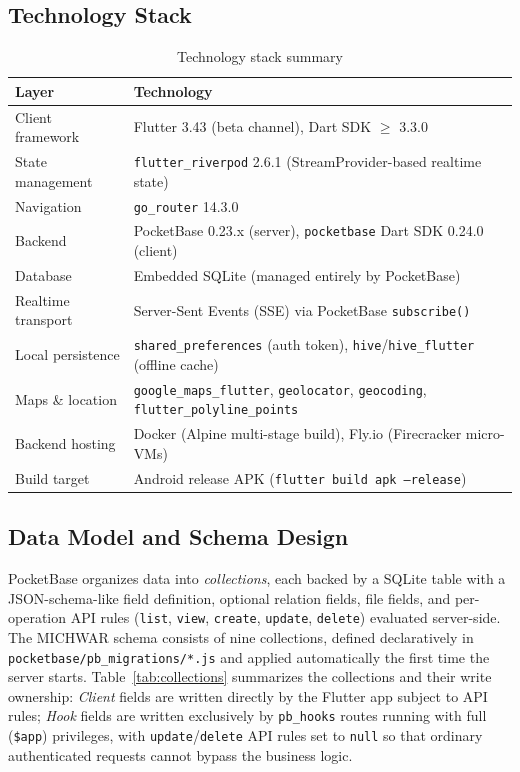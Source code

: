 \documentclass[11pt,a4paper]{article}
\begin{document}
\subsection{Technology Stack}

\begin{table}[htbp]
\centering
\caption{Technology stack summary}
\label{tab:stack}
\begin{tabular}{@{}p{3.6cm}p{9.5cm}@{}}
\toprule
\textbf{Layer} & \textbf{Technology} \\
\midrule
Client framework & Flutter 3.43 (beta channel), Dart SDK $\geq$ 3.3.0 \\
State management & \texttt{flutter\_riverpod} 2.6.1 (StreamProvider-based realtime state) \\
Navigation & \texttt{go\_router} 14.3.0 \\
Backend & PocketBase 0.23.x (server), \texttt{pocketbase} Dart SDK 0.24.0 (client) \\
Database & Embedded SQLite (managed entirely by PocketBase) \\
Realtime transport & Server-Sent Events (SSE) via PocketBase \texttt{subscribe()} \\
Local persistence & \texttt{shared\_preferences} (auth token), \texttt{hive}/\texttt{hive\_flutter} (offline cache) \\
Maps \& location & \texttt{google\_maps\_flutter}, \texttt{geolocator}, \texttt{geocoding}, \texttt{flutter\_polyline\_points} \\
Backend hosting & Docker (Alpine multi-stage build), Fly.io (Firecracker micro-VMs) \\
Build target & Android release APK (\texttt{flutter build apk --release}) \\
\bottomrule
\end{tabular}
\end{table}

\subsection{Data Model and Schema Design}
\label{sec:schema}

PocketBase organizes data into \textit{collections}, each backed by a SQLite
table with a JSON-schema-like field definition, optional relation fields,
file fields, and per-operation API rules (\texttt{list}, \texttt{view},
\texttt{create}, \texttt{update}, \texttt{delete}) evaluated server-side. The
MICHWAR schema consists of nine collections, defined declaratively in
\texttt{pocketbase/pb\_migrations/*.js} and applied automatically the first
time the server starts. Table~\ref{tab:collections} summarizes the
collections and their write ownership: \textit{Client} fields are written
directly by the Flutter app subject to API rules; \textit{Hook} fields are
written exclusively by \texttt{pb\_hooks} routes running with full
(\texttt{\$app}) privileges, with \texttt{update}/\texttt{delete} API rules set to
\texttt{null} so that ordinary authenticated requests cannot bypass the
business logic.
\end{document}
